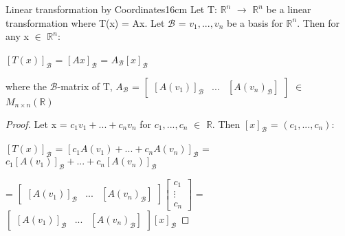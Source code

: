     \newpage



    \begin{wtheorem}{Linear transformation by Coordinates}{16cm}
        Let T: $\mathbb{R}^n$ $\rightarrow$ $\mathbb{R}^n$
        be a linear transformation where T(x) = Ax.
        Let $\mathcal{B}$ = $v_1,...,v_n$
        be a basis for $\mathbb{R}^n$.
        Then for any x $\in$ $\mathbb{R}^n$:

        \hspace{0.5cm}
        $[T(x)]_{\mathcal{B}}$
        = $[Ax]_{\mathcal{B}}$
        = $A_{\mathcal{B}}[x]_{\mathcal{B}}$

        where the {\color{lblue} $\mathcal{B}$-matrix of T}, $A_{\mathcal{B}}$ =
        $\begin{bmatrix}
            [A(v_1)]_{\mathcal{B}} & ... & [A(v_n)_{\mathcal{B}}]
        \end{bmatrix}$ $\in$ $M_{n \times n}(\mathbb{R})$
    \end{wtheorem}

    \begin{proof}
        Let x = $c_1v_1 + ... + c_nv_n$ for $c_1,...,c_n$ $\in$ $\mathbb{R}$.
        Then $[x]_{\mathcal{B}}$ = $(c_1,...,c_n)$:

        \hspace{0.5cm}
        $[T(x)]_{\mathcal{B}}$
        = $[c_1A(v_1) + ... + c_nA(v_n)]_{\mathcal{B}}$
        = $c_1[A(v_1)]_{\mathcal{B}} + ... + c_n[A(v_n)]_{\mathcal{B}}$
        
        \hspace{1.9cm}
        =
        $\begin{bmatrix}
            [A(v_1)]_{\mathcal{B}} & ... & [A(v_n)_{\mathcal{B}}]
        \end{bmatrix}
        \begin{bmatrix}
            c_1 \\
            \vdots \\
            c_n
        \end{bmatrix}$ =
        $\begin{bmatrix}
            [A(v_1)]_{\mathcal{B}} & ... & [A(v_n)_{\mathcal{B}}]
        \end{bmatrix}
        [x]_{\mathcal{B}}$  
    \end{proof}

    \vspace{0.5cm}



